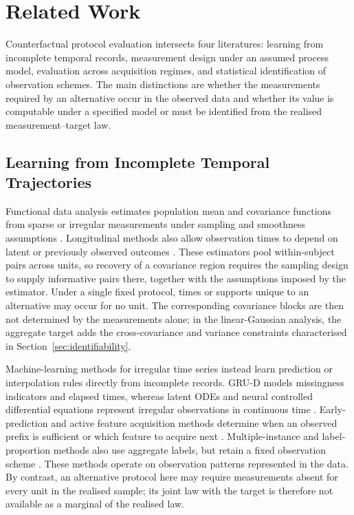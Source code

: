 \section{Related Work}
\label{sec:related}

Counterfactual protocol evaluation intersects four literatures: learning from
incomplete temporal records, measurement design under an assumed process
model, evaluation across acquisition regimes, and statistical identification
of observation schemes. The main distinctions are whether the measurements
required by an alternative occur in the observed data and whether its value is
computable under a specified model or must be identified from the realised
measurement--target law.

\subsection{Learning from Incomplete Temporal Trajectories}
\label{sec:rw-incomplete}

Functional data analysis estimates population mean and covariance functions
from sparse or irregular measurements under sampling and smoothness
assumptions
\citep{ramsay2005functional,yao2005sparse,hall2006properties,li2010uniform}.
Longitudinal methods also allow observation times to depend on latent or
previously observed outcomes
\citep{pullenayegum2016irregular,weaver2023informative}. These estimators pool
within-subject pairs across units, so recovery of a covariance region requires
the sampling design to supply informative pairs there, together with the
assumptions imposed by the estimator. Under a single fixed protocol, times or
supports unique to an alternative may occur for no unit. The corresponding
covariance blocks are then not determined by the measurements alone; in the
linear-Gaussian analysis, the aggregate target adds the cross-covariance and
variance constraints characterised in Section~\ref{sec:identifiability}.

Machine-learning methods for irregular time series instead learn prediction or
interpolation rules directly from incomplete records. GRU-D models missingness
indicators and elapsed times, whereas latent ODEs and neural controlled
differential equations represent irregular observations in continuous time
\citep{che2018grud,rubanova2019latent,kidger2020neural,shukla2020survey}.
Early-prediction and active feature acquisition methods determine when an
observed prefix is sufficient or which feature to acquire next
\citep{xing2009early,shim2018joint}. Multiple-instance and label-proportion
methods also use aggregate labels, but retain a fixed observation scheme
\citep{dietterich1997multiple,quadrianto2009labels,zhou2018brief}. These methods
operate on observation patterns represented in the data. By contrast, an
alternative protocol here may require measurements absent for every unit in
the realised sample; its joint law with the target is therefore not available
as a marginal of the realised law.

